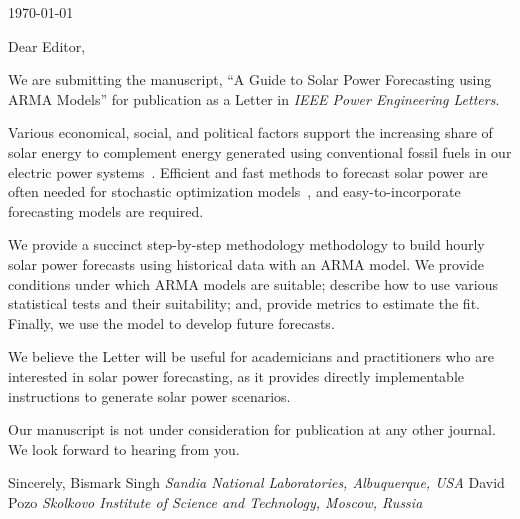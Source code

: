 \documentclass[11pt]{article} %
\begin{document}






\today
\par
Dear Editor,
\par
We are submitting the manuscript, ``A Guide to Solar Power Forecasting using ARMA
Models'' for publication as a Letter in \textit{IEEE Power Engineering Letters}.
\par
Various economical, social, and political factors support the increasing share 
of solar energy to complement energy generated using conventional fossil fuels 
in our electric power systems~\cite{stoddard2006economic}. Efficient and fast methods to forecast solar power are often needed for stochastic optimization
models~\cite{su2014stochastic}, and easy-to-incorporate forecasting models are required.
\par
We provide a succinct step-by-step methodology methodology to build hourly 
solar power forecasts using historical data with an ARMA model. We provide 
conditions under which ARMA models are suitable; describe how to use 
various statistical tests and their suitability; and, provide metrics 
to estimate the fit. Finally, we use the model to develop future 
forecasts.

We believe the Letter will be useful for academicians and practitioners who 
are interested in solar power forecasting, as it provides directly 
implementable instructions to generate solar power scenarios. 
\par
Our manuscript is not under consideration for publication at any other journal. We look forward to hearing from you.
\par
Sincerely,
\newline
Bismark Singh
\newline
\textit{Sandia National Laboratories, Albuquerque, USA}
\newline
\noindent
David Pozo
\newline
\textit{Skolkovo Institute of Science and Technology, Moscow, Russia }
\end{document}
